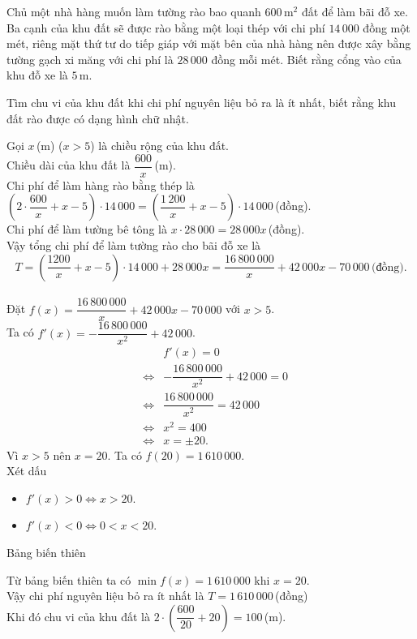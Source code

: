 
\begin{ex}%
	Chủ một nhà hàng muốn làm tường rào bao quanh $600$\,m$^2$ đất để làm bãi đỗ xe. Ba cạnh của khu đất sẽ được rào bằng một loại thép với chi phí $14\,000$ đồng một mét, riêng mặt thứ tư do tiếp giáp với mặt bên của nhà hàng nên được xây bằng tường gạch xi măng với chi phí là $28\,000$ đồng mỗi mét. Biết rằng cổng vào của khu đỗ xe là $5$\,m.
	\begin{center}
	\end{center}
	Tìm chu vi của khu đất khi chi phí nguyên liệu bỏ ra là ít nhất, biết rằng khu đất rào được có dạng hình chữ nhật.
	\loigiai
	{Gọi $x$\,(m) ($x>5$) là chiều rộng của khu đất.\\
	Chiều dài của khu đất là $\dfrac{600}{x}$\,(m).\\
	Chi phí để làm hàng rào bằng thép là $\left(2\cdot\dfrac{600}{x}+x-5\right)\cdot 14\,000=\left(\dfrac{1\,200}{x}+x-5\right)\cdot 14\,000 $\,(đồng).\\
	Chi phí để làm tường bê tông là $x\cdot28\,000=28\,000x$\,(đồng).\\
	Vậy tổng chi phí để làm tường rào cho bãi đỗ xe là \[T=\left(\dfrac{1200}{x}+x-5\right)\cdot 14\,000 + 28\,000x=\dfrac{16\,800\,000}{x}+42\,000x-70\,000\,\text{(đồng)}.\]\\
	Đặt $f(x)=\dfrac{16\,800\,000}{x}+42\,000x-70\,000$ với $x>5$.\\
	Ta có $f'(x)=-\dfrac{16\,800\,000}{x^2}+42\,000$.
	\begin{eqnarray*}
		& & f'(x)=0\\
		&\Leftrightarrow & -\dfrac{16\,800\,000}{x^2}+42\,000=0\\
		&\Leftrightarrow & \dfrac{16\,800\,000}{x^2}=42\,000\\
		&\Leftrightarrow & x^2=400\\
		&\Leftrightarrow & x=\pm 20.
	\end{eqnarray*}
	Vì $x>5$ nên $x=20$. Ta có $f(20)=1\,610\,000$.\\
	Xét dấu
	\begin{itemize}
		\item $f'(x)>0\Leftrightarrow x>20$.
		\item $f'(x)<0\Leftrightarrow 0<x<20$.
	\end{itemize}
	Bảng biến thiên
	\begin{center}
	\end{center}
	Từ bảng biến thiên ta có $\min\limits f(x)=1\,610\,000$ khi $x=20$.\\
	Vậy chi phí nguyên liệu bỏ ra ít nhất là  $T=1\,610\,000$\,(đồng) \\
	Khi đó chu vi của khu đất là $2\cdot\left(\dfrac{600}{20}+20\right)=100$\,(m).
	}
\end{ex}

